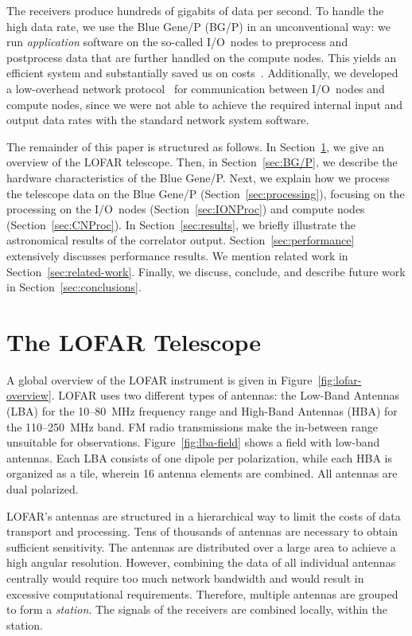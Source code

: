 \documentclass{sig-alternate}
\begin{document}
The receivers produce hundreds of gigabits of data per second.
To handle the high data rate,
we use the Blue Gene/P (BG/P) in an unconventional way: we run
\emph{application\/} software on the so-called I/O~nodes to preprocess and
postprocess data that are further handled on the compute nodes.
This yields an efficient system and substantially saved us on
costs~\cite{Iskra:08}.
Additionally, we developed a low-overhead network protocol~\cite{Romein:09a}
for communication between I/O~nodes and compute nodes, since we were not able
to achieve the required internal input and output data rates with the standard
network system software.

The remainder of this paper is structured as follows.
In Section~\ref{sec:overview}, we give an overview of the LOFAR telescope.
Then, in Section~\ref{sec:BG/P}, we describe the hardware characteristics of
the Blue Gene/P.
Next, we explain how we process the telescope data on the Blue Gene/P
(Section~\ref{sec:processing}), focusing on the processing on the I/O~nodes
(Section~\ref{sec:IONProc}) and compute nodes (Section~\ref{sec:CNProc}).
In Section~\ref{sec:results}, we briefly illustrate the astronomical results
of the correlator output.
Section~\ref{sec:performance} extensively discusses performance results.
We mention related work in Section~\ref{sec:related-work}.
Finally, we discuss, conclude, and describe future work in
Section~\ref{sec:conclusions}.


\section{The LOFAR Telescope}
\label{sec:overview}

A global overview of the LOFAR instrument is given in
Figure~\ref{fig:lofar-overview}. LOFAR uses two different types of
antennas: the Low-Band Antennas (LBA) for the 10--80~MHz frequency
range and High-Band Antennas (HBA) for the 110--250~MHz band.
FM radio transmissions make the in-between range unsuitable for observations.
Figure~\ref{fig:lba-field} shows a field with low-band antennas. Each
LBA consists of one dipole per polarization, while each HBA is
organized as a tile, wherein 16 antenna elements are combined. All
antennas are dual polarized.

LOFAR's antennas are structured in a hierarchical way to limit the
costs of data transport and processing. Tens of thousands of antennas are
necessary to obtain sufficient sensitivity. The antennas are
distributed over a large area to achieve a high angular resolution.
However, combining the data of all individual antennas centrally would
require too much network bandwidth and would result in excessive
computational requirements. Therefore, multiple antennas are grouped
to form a \emph{station}.
The signals of the receivers are combined locally, within the station.
\end{document}
